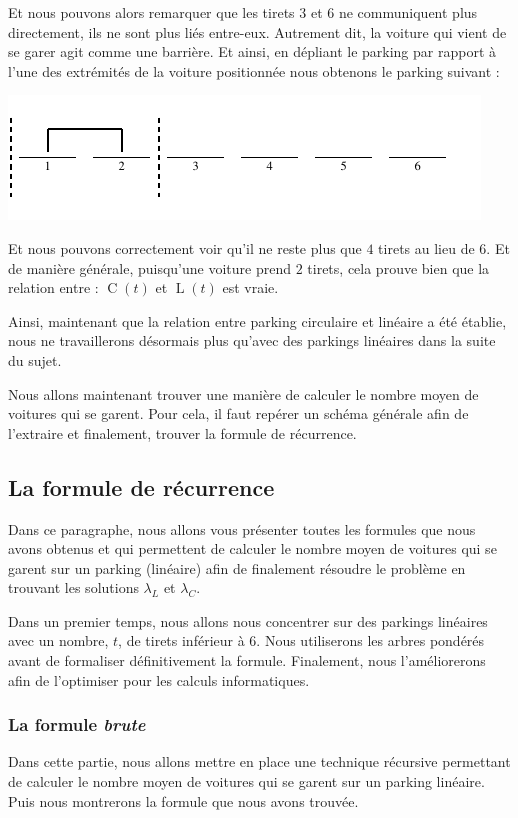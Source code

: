 \documentclass[a4paper,francais,11pt]{article}
\begin{document}
Et nous pouvons alors remarquer que les tirets $3$ et $6$ ne communiquent plus directement, ils ne sont plus liés entre-eux. Autrement dit, la voiture qui vient de se garer agit comme une barrière. Et ainsi, en dépliant le parking par rapport à l'une des extrémités de la voiture positionnée nous obtenons le parking suivant :
\begin{center}
\includegraphics{fig6.pdf}
\end{center}

Et nous pouvons correctement voir qu'il ne reste plus que $4$ tirets au lieu de $6$. Et de manière générale, puisqu'une voiture prend $2$ tirets, cela prouve bien que la relation entre : $\operatorname{C}\left(t\right)$ et $\operatorname{L}\left(t\right)$ est vraie.

Ainsi, maintenant que la relation entre parking circulaire et linéaire a été établie, nous ne travaillerons désormais plus qu'avec des parkings linéaires dans la suite du sujet. 

Nous allons maintenant trouver une manière de calculer le nombre moyen de voitures qui se garent. Pour cela, il faut repérer un schéma générale afin de l'extraire et finalement, trouver la formule de récurrence.
\subsection{La formule de récurrence}
Dans ce paragraphe, nous allons vous présenter toutes les formules que nous avons obtenus et qui permettent de calculer le nombre moyen de voitures qui se garent sur un parking (linéaire) afin de finalement résoudre le problème en trouvant les solutions $\lambda_L$ et $\lambda_C$.

Dans un premier temps, nous allons nous concentrer sur des parkings linéaires avec un nombre, $t$, de tirets inférieur à $6$. Nous utiliserons les arbres pondérés avant de formaliser définitivement la formule. Finalement, nous l'améliorerons afin de l'optimiser pour les calculs informatiques.
\subsubsection{La formule \emph{brute}}
Dans cette partie, nous allons mettre en place une technique récursive permettant de calculer le nombre moyen de voitures qui se garent sur un parking linéaire. Puis nous montrerons la formule que nous avons trouvée.
\end{document}
